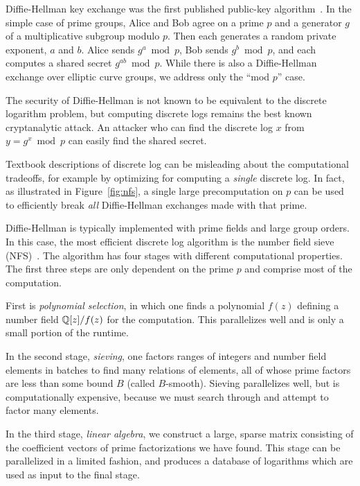 Diffie-Hellman key exchange was the first published public-key
algorithm~\cite{new-directions-in-crypto-1976}. In the simple case of prime
groups, Alice and Bob agree on a prime $p$ and a generator $g$ of a
multiplicative subgroup modulo $p$. Then each generates a random private
exponent, $a$ and $b$. Alice sends $g^a \bmod p$, Bob sends $g^b \bmod p$,
and each computes a shared secret $g^{ab} \bmod p$. While there is also a
Diffie-Hellman exchange over elliptic curve groups, we address only the ``mod
$p$'' case.

The security of Diffie-Hellman is not known to be equivalent to the discrete
logarithm problem, but computing discrete logs remains the best known
cryptanalytic attack. An attacker who can find the discrete log $x$ from $y =
g^x \bmod p$ can easily find the shared secret.

Textbook descriptions of discrete log can be misleading about the
computational tradeoffs, for example by optimizing for computing a
\emph{single} discrete log. In fact, as illustrated in Figure~\ref{fig:nfs},
a single large precomputation on $p$ can be used to efficiently break
\emph{all} Diffie-Hellman exchanges made with that prime.

Diffie-Hellman is typically implemented with prime fields and large group
orders. In this case, the most efficient discrete log algorithm is the number
field sieve
(NFS)~\cite{discrete-log-nfs-1993,virtual-logarithms-2005,nfs-prime-field-2003}.
The algorithm has four stages with different computational properties. The
first three steps are only dependent on the prime $p$ and comprise most of
the computation.

First is \emph{polynomial selection}, in which one finds a polynomial $f(z)$
defining a number field $\mathbb{Q}[z]/f(z)$ for the computation. This parallelizes
well and is only a small portion of the runtime.

In the second stage, \emph{sieving}, one factors ranges of integers and
number field elements in batches to find many relations of elements, all of
whose prime factors are less than some bound $B$ (called $B$-smooth). Sieving
parallelizes well, but is computationally expensive, because we must search
through and attempt to factor many elements.

In the third stage, \emph{linear algebra}, we construct a large, sparse
matrix consisting of the coefficient vectors of prime factorizations we have
found. This stage can be parallelized in a limited fashion, and produces a
database of logarithms which are used as input to the final stage.

